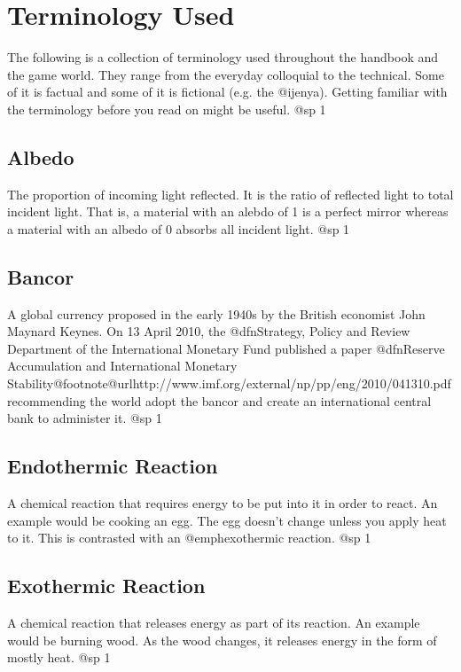 \chapter{Terminology Used}

The following is a collection of terminology used throughout the handbook and the game world. They range from the everyday colloquial to the technical. Some of it is factual and some of it is fictional (e.g. the @i{jenya}). Getting familiar with the terminology before you read on might be useful.
@sp 1

\section{Albedo}
The proportion of incoming light reflected. It is the ratio of reflected light to total incident light. That is, a material with an alebdo of 1 is a perfect mirror whereas a material with an albedo of 0 absorbs all incident light.
@sp 1

\section{Bancor}
A global currency proposed in the early 1940s by the British economist John Maynard Keynes. On 13 April 2010, the @dfn{Strategy, Policy and Review Department of the International Monetary Fund} published a paper @dfn{Reserve Accumulation and International Monetary Stability}@footnote{@url{http://www.imf.org/external/np/pp/eng/2010/041310.pdf}} recommending the world adopt the bancor and create an international central bank to administer it.
@sp 1

\section{Endothermic Reaction}
A chemical reaction that requires energy to be put into it in order to react. An example would be cooking an egg. The egg doesn't change unless you apply heat to it. This is contrasted with an @emph{exothermic reaction}.
@sp 1

\section{Exothermic Reaction}
A chemical reaction that releases energy as part of its reaction. An example would be burning wood. As the wood changes, it releases energy in the form of mostly heat.
@sp 1

